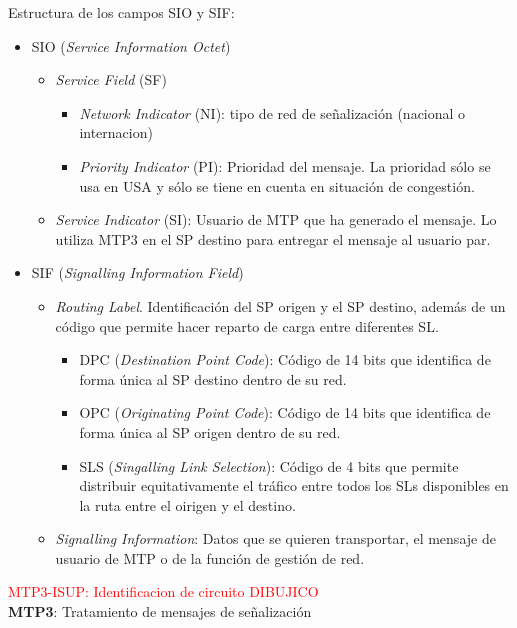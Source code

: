\documentclass[10pt,portrait, twocolumn]{article}
\begin{document}
Estructura de los campos SIO y SIF:

	\begin{itemize}
		\item SIO (\textit{Service Information Octet})
			\begin{itemize}
			\item \textit{Service Field} (SF)
				\begin{itemize}
				\item \textit{Network Indicator} (NI): tipo de red de señalización (nacional o internacion)
				\item \textit{Priority Indicator} (PI): Prioridad del mensaje. La prioridad sólo se usa en USA y sólo se tiene en cuenta en situación de congestión.
				\end{itemize}
			\item \textit{Service Indicator} (SI): Usuario de MTP que ha generado el mensaje. Lo utiliza MTP3 en el SP destino para entregar el mensaje al usuario par.
			\end{itemize}
	\item SIF (\textit{Signalling Information Field})
		\begin{itemize}
		\item \textit{Routing Label}. Identificación del SP origen y el SP destino, además de un código que permite hacer reparto de carga entre diferentes SL.
			\begin{itemize}
			\item DPC (\textit{Destination Point Code}): Código de 14 bits que identifica de forma única al SP destino dentro de su red.
			\item OPC (\textit{Originating Point Code}): Código de 14 bits que identifica de forma única al SP origen dentro de su red.
			\item SLS (\textit{Singalling Link Selection}): Código de 4 bits que permite distribuir equitativamente el tráfico entre todos los SLs disponibles en la ruta entre el oirigen y el destino.
			\end{itemize}
		\item \textit{Signalling Information}: Datos que se quieren transportar, el mensaje de usuario de MTP o de la función de gestión de red.
		\end{itemize}
	\end{itemize}
	
\textcolor{red}{MTP3-ISUP: Identificacion de circuito DIBUJICO}\\

\textbf{MTP3}: Tratamiento de mensajes de señalización
\end{document}
